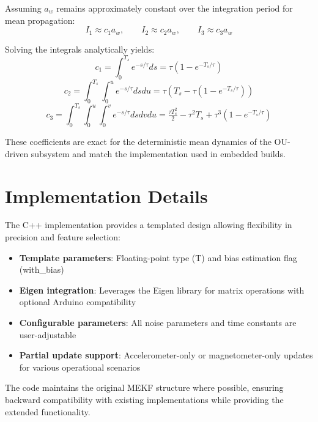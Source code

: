 \documentclass[11pt,letterpaper]{article}
\begin{document}
Assuming $a_w$ remains approximately constant over the integration period for mean propagation:
\[
I_1 \approx c_1 a_w,\qquad I_2 \approx c_2 a_w,\qquad I_3 \approx c_3 a_w
\]

Solving the integrals analytically yields:
\[
c_1 = \int_0^{T_s} e^{-s/\tau} ds = \tau(1-e^{-T_s/\tau})
\]
\[
c_2 = \int_0^{T_s} \int_0^u e^{-s/\tau} ds du = \tau\left(T_s-\tau(1-e^{-T_s/\tau})\right)
\]
\[
c_3 = \int_0^{T_s} \int_0^u \int_0^v e^{-s/\tau} ds dv du = \tfrac{\tau T_s^2}{2}-\tau^2 T_s+\tau^3(1-e^{-T_s/\tau})
\]

These coefficients are exact for the deterministic mean dynamics of the OU-driven subsystem and match the implementation used in embedded builds.

\section{Implementation Details}
\label{app:implementation}

The C++ implementation provides a templated design allowing flexibility in precision and feature selection:

\begin{itemize}
\item \textbf{Template parameters}: Floating-point type (T) and bias estimation flag (with\_bias)
\item \textbf{Eigen integration}: Leverages the Eigen library for matrix operations with optional Arduino compatibility
\item \textbf{Configurable parameters}: All noise parameters and time constants are user-adjustable
\item \textbf{Partial update support}: Accelerometer-only or magnetometer-only updates for various operational scenarios
\end{itemize}

The code maintains the original MEKF structure where possible, ensuring backward compatibility with existing implementations while providing the extended functionality.
\end{document}
